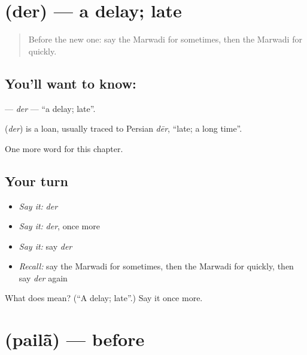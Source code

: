 \section[\texorpdfstring{\mw{देर} (der)}{देर (der)}]{ (der) — a delay; late}

\label{lesson:MW-C80-der}



\begin{quote}
Before the new one: say the Marwadi for sometimes, then the Marwadi for quickly.
\end{quote}

\subsection*{You'll want to know: }
\textbf{} — \emph{der} — \textquotedblleft{}a delay; late\textquotedblright{}.

\begin{cousinweb}
\textbf{} (\emph{der}) is a loan, usually traced to Persian \emph{dēr}, \textquotedblleft{}late; a long time\textquotedblright{}.
\end{cousinweb}

\begin{grammarlens}[title={What you've built}]
One more word for this chapter.
\end{grammarlens}

\subsection*{Your turn}
\begin{itemize}
\raggedright
  \item \emph{Say it:} \emph{der}
  \item \emph{Say it:} \emph{der}, once more
  \item \emph{Say it:} say \emph{der}
  \item \emph{Recall:} say the Marwadi for sometimes, then the Marwadi for quickly, then say \emph{der} again
\end{itemize}

\begin{tcolorbox}[breakable,colback=teal!4,colframe=teal!35!black,title={Before you move on}]
What does  mean? (\textquotedblleft{}A delay; late\textquotedblright{}.) Say it once more.
\end{tcolorbox}
\section[\texorpdfstring{\mw{पैलां} (pailā̃)}{पैलां (pailā̃)}]{ (pailā̃) — before}

